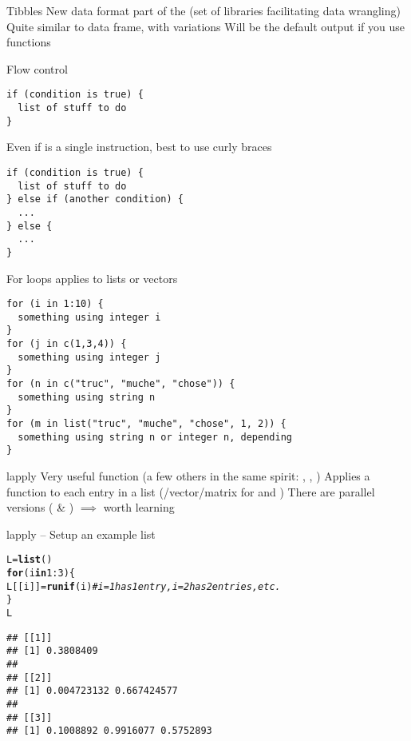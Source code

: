 \documentclass[aspectratio=169]{beamer}\usepackage[]{graphicx}\usepackage[]{xcolor}
\makeatletter
\newcommand{\hlnum}[1]{\textcolor[rgb]{0.686,0.059,0.569}{#1}}%
\newcommand{\hlcom}[1]{\textcolor[rgb]{0.678,0.584,0.686}{\textit{#1}}}%
\newcommand{\hlopt}[1]{\textcolor[rgb]{0,0,0}{#1}}%
\newcommand{\hldef}[1]{\textcolor[rgb]{0.345,0.345,0.345}{#1}}%
\newcommand{\hlkwa}[1]{\textcolor[rgb]{0.161,0.373,0.58}{\textbf{#1}}}%
\newcommand{\hlkwb}[1]{\textcolor[rgb]{0.69,0.353,0.396}{#1}}%
\newcommand{\hlkwd}[1]{\textcolor[rgb]{0.737,0.353,0.396}{\textbf{#1}}}%
\newenvironment{kframe}{%
 \def\at@end@of@kframe{}%
 \ifinner\ifhmode%
  \def\at@end@of@kframe{\end{minipage}}%
  \begin{minipage}{\columnwidth}%
 \fi\fi%
 \def\FrameCommand##1{\hskip\@totalleftmargin \hskip-\fboxsep
 \colorbox{shadecolor}{##1}\hskip-\fboxsep
     \hskip-\linewidth \hskip-\@totalleftmargin \hskip\columnwidth}%
 \MakeFramed {\advance\hsize-\width
   \@totalleftmargin\z@ \linewidth\hsize
   \@setminipage}}%
 {\par\unskip\endMakeFramed%
 \at@end@of@kframe}
\newenvironment{knitrout}{}{} %
\makeatother
\begin{document}
\begin{frame}{Tibbles}
\bbullet
New data format part of the  (set of libraries facilitating data wrangling)
\vfill
\bbullet
Quite similar to data frame, with variations
\vfill
\bbullet Will be the default output if you use  functions
\end{frame}


\begin{frame}[fragile]{Flow control}
\begin{lstlisting}
if (condition is true) {
  list of stuff to do
}
\end{lstlisting}
Even if  is a single instruction, best to use curly braces
\begin{lstlisting}
if (condition is true) {
  list of stuff to do
} else if (another condition) {
  ...
} else {
  ...
}
\end{lstlisting}
\end{frame} 

\begin{frame}[fragile]{For loops}
 applies to lists or vectors
\begin{lstlisting}
for (i in 1:10) {
  something using integer i
}
for (j in c(1,3,4)) {
  something using integer j
}
for (n in c("truc", "muche", "chose")) {
  something using string n
}
for (m in list("truc", "muche", "chose", 1, 2)) {
  something using string n or integer n, depending
}
\end{lstlisting}
\end{frame} 

\begin{frame}[fragile]{lapply}
Very useful function (a few others in the same spirit: , , )
\vfill
Applies a function to each entry in a list (/vector/matrix for  and )
\vfill
There are parallel versions ( \& ) $\implies$ worth learning
\end{frame}

\begin{frame}[fragile]{lapply -- Setup an example list}
\begin{knitrout}
\color{fgcolor}\begin{kframe}
\begin{alltt}
\hldef{L} \hlkwb{=} \hlkwd{list}\hldef{()}
\hlkwa{for} \hldef{(i} \hlkwa{in} \hlnum{1}\hlopt{:}\hlnum{3}\hldef{) \{}
        \hldef{L[[i]]} \hlkwb{=} \hlkwd{runif}\hldef{(i)} \hlcom{# i=1 has 1 entry, i=2 has 2 entries, etc.}
\hldef{\}}
\hldef{L}
\end{alltt}
\begin{verbatim}
## [[1]]
## [1] 0.3808409
## 
## [[2]]
## [1] 0.004723132 0.667424577
## 
## [[3]]
## [1] 0.1008892 0.9916077 0.5752893
\end{verbatim}
\end{kframe}
\end{knitrout}
\end{frame}
\end{document}
